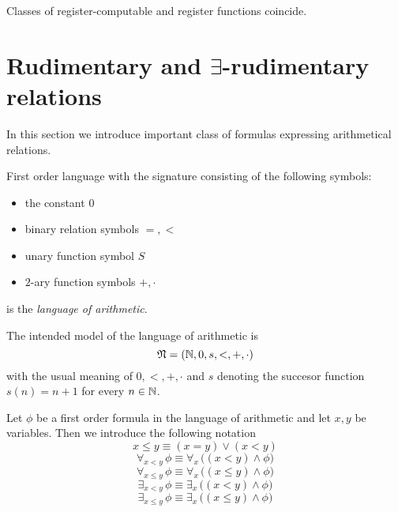 \documentclass[10pt]{amsart}
\begin{document}
\begin{corollary}\label{corollary:register_computable_are_recursive}
	Classes of register-computable and register functions coincide.
\end{corollary}

\begin{corollary}\label{corollary:normal_form_Kleene}
\end{corollary}






\section{Rudimentary and $\exists$-rudimentary relations}
\noindent
In this section we introduce important class of formulas expressing arithmetical relations.

\begin{definition}
	First order language with the signature consisting of the following symbols:
	\begin{itemize}
	\item[] the constant $0$
	\item[] binary relation symbols $=, <$
	\item[] unary function symbol $S$
	\item[] $2$-ary function symbols $+,\cdot$
	\end{itemize}
	is the \textit{language of arithmetic}.
\end{definition}
The intended model of the language of arithmetic is 
$${\mathfrak N} = \left({\mathbb N},0,s,<,+,\cdot\right)$$
with the usual meaning of $0,<,+,\cdot$ and $s$ denoting the succesor function $s(n) = n + 1$ for every $n \in {\mathbb N}$. 

\begin{remark}\label{remark:bounded_quantifiers_notation}
	Let $\phi$ be a first order formula in the language of arithmetic and let $x,y$ be variables. Then we introduce the following notation
	$$x \leq y \equiv \left(x = y\right) \vee \left(x < y\right)$$
	$$\forall_{x < y}\,\phi \equiv \forall_x\,\big(\left(x < y\right)\wedge \phi\big)$$
	$$\forall_{x \leq y}\,\phi \equiv \forall_x\,\big(\left(x \leq y\right)\wedge \phi\big)$$
	$$\exists_{x < y}\,\phi \equiv \exists_x\,\big(\left(x < y\right)\wedge \phi\big)$$
	$$\exists_{x \leq y}\,\phi \equiv \exists_x\,\big(\left(x \leq y\right)\wedge \phi\big)$$
\end{remark}
\end{document}
